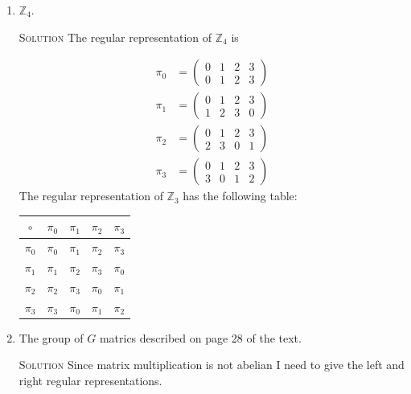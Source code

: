 \documentclass[twoside]{amsart}
\newcommand{\Integers}{\ensuremath{\mathbb{Z}{}}\xspace}
\newcommand{\solution}{\textsc{Solution}\xspace}
\newcommand{\blank}{\vspace{5pt}}
\begin{document}
\begin{enumerate}[A.]
\begin{enumerate}[1]
      \blank
      \item $\Integers_4$.

      \blank \noindent \solution The regular representation of 
      $\Integers_4$ is

      \begin{align*}
         \pi_0 &= 
            \begin{pmatrix}
               0 & 1 & 2 & 3 \\
               0 & 1 & 2 & 3
            \end{pmatrix} \\
         \pi_1 &= 
            \begin{pmatrix}
               0 & 1 & 2 & 3 \\
               1 & 2 & 3 & 0
            \end{pmatrix} \\
         \pi_2 &= 
            \begin{pmatrix}
               0 & 1 & 2 & 3 \\
               2 & 3 & 0 & 1
            \end{pmatrix} \\
         \pi_3 &= 
            \begin{pmatrix}
               0 & 1 & 2 & 3 \\
               3 & 0 & 1 & 2
            \end{pmatrix} 
      \end{align*}
      The regular representation of $\Integers_3$ has the following table:

      \begin{center}
      \begin{tabular}{c|cccc}
         $\circ$ & $\pi_0$ & $\pi_1$ & $\pi_2$ & $\pi_3$ \\ \hline
         $\pi_0$ & $\pi_0$ & $\pi_1$ & $\pi_2$ & $\pi_3$ \\
         $\pi_1$ & $\pi_1$ & $\pi_2$ & $\pi_3$ & $\pi_0$ \\
         $\pi_2$ & $\pi_2$ & $\pi_3$ & $\pi_0$ & $\pi_1$ \\
         $\pi_3$ & $\pi_3$ & $\pi_0$ & $\pi_1$ & $\pi_2$  
      \end{tabular}
      \end{center}

      \blank
      \item The group of $G$ matrics described on page 28 of the text.

      \blank \noindent \solution Since matrix multiplication is not
      abelian I need to give the left and right regular representations.


\end{enumerate}
\end{enumerate}
\end{document}
